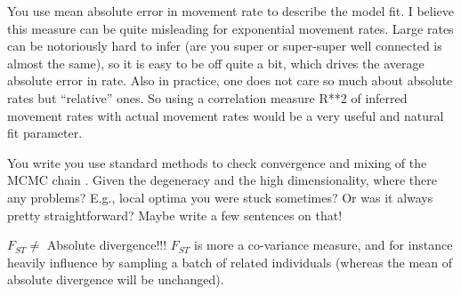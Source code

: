 
\begin{point}{}
    You use mean absolute error in movement rate to describe the model fit. I
    believe this measure can be quite misleading for exponential movement rates.
    Large rates can be notoriously hard to infer (are you super or super-super well
    connected is almost the same), so it is easy to be off quite a bit, which
    drives the average absolute error in rate. Also in practice, one does not care
    so much about absolute rates but ``relative'' ones. So using a correlation
    measure R**2  of inferred movement rates with actual movement rates would be a
    very useful and natural fit parameter.  
\end{point}


\begin{point}{}
    You write you use standard methods to check convergence and mixing of the
    MCMC chain . Given the degeneracy and the high dimensionality,
    where there any problems? E.g., local optima you were stuck sometimes? Or
    was it always pretty straightforward? Maybe write a few sentences on that!
\end{point}


\begin{point}{\revref}
    $F_{ST} \neq$ Absolute divergence!!!  $F_{ST}$ is more a
    co-variance measure, and for instance heavily influence by sampling a batch
    of related individuals (whereas the mean of absolute divergence will be
    unchanged).
\end{point}


